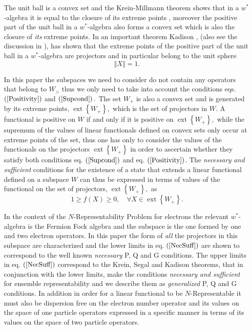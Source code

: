 \documentclass[aps,preprint]{revtex4}%
\begin{document}
The unit ball is a convex set and the Krein-Millmann theorem \cite{Encyclo}
shows that in a $w^{\ast}$-algebra \cite{Encyclo} it is equal to the closure
of its extreme points \cite{Kummar67}, moreover the positive part of the unit
ball in a $w^{\ast}$-algebra also forms a convex set which is also the closure
of \emph{its} extreme points. In an important theorem Kadison \cite{Kadison},
(also see the discussion in \cite{Takesaki}), has shown that the extreme
points of the positive part of the unit ball in a $w^{\ast}$-algebra are
projectors and in particular belong to the unit sphere
\begin{equation}
\left\Vert X\right\Vert =1.
\end{equation}


In this paper the subspaces we need to consider do not contain any operators
that belong to $W_{>}$ thus we only need to take into account the conditions
eqs. $\left(  \ref{Positivity}\right)  $ and $\left(  \ref{Supcond}\right)  .$
The set $W_{+}$ is also a convex set and is generated by its extreme points,
$\operatorname*{ext}\left\{  W_{+}\right\}  ,$ which is the set of projectors
in $W.$ A functional is positive on $W$ if and only if it is positive on
$\operatorname*{ext}\left\{  W_{+}\right\}  ,$ while the supremum of the
values of linear functionals defined on convex sets only occur at extreme
points of the set, thus one has only to consider the values of the functionals
on the projectors $\operatorname*{ext}\left\{  W_{+}\right\}  $ in order to
ascertain whether they satisfy both conditions eq. $\left(  \ref{Supcond}%
\right)  $ and eq. $\left(  \ref{Positivity}\right)  $. The \emph{necessary
and sufficient }conditions for the existence of a state that extends a linear
functional defined on a subspace $W$ can thus be expressed in terms of values
of the functional on the set of projectors, $\operatorname*{ext}\left\{
W_{+}\right\}  ,$ as
\begin{equation}
1\geq f\left(  X\right)  \geq0,\quad\forall X\in\operatorname*{ext}\left\{
W_{+}\right\}  . \label{NecSuff}%
\end{equation}


In the context of the $N$-Representability Problem for electrons the relevant
$w^{\ast}$-algebra is the Fermion Fock algebra and the subspace is the one
formed by one and two electron operators. In this paper the form of \emph{all
}the projectors in this subspace are characterized and the lower limits in eq.
$\left(  \ref{NecSuff}\right)  $ are shown to correspond to the well known
\cite{PQG} \emph{necessary} P, Q and G conditions. The upper limits in eq.
$\left(  \ref{NecSuff}\right)  $ correspond to the Krein, Segal and Kadison
theorems, that in conjunction with the lower limits, make the conditions
\emph{necessary and sufficient }for ensemble representability and we describe
them as \emph{generalized }P, Q and G conditions. In addition in order for a
linear functional to be $N$-Representable it must also be dispersion free on
the electron number operator and its values on the space of one particle
operators expressed in a specific manner in terms of its values on the space
of two particle operators.
\end{document}
